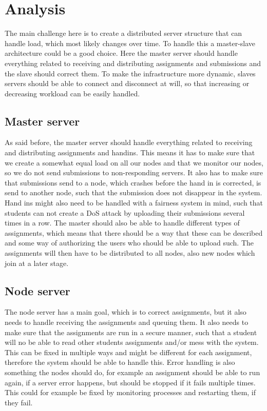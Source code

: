 \chapter{Analysis}
The main challenge here is to create a distributed server structure that can
handle load, which most likely changes over time. To handle this a master-slave
architecture could be a good choice. Here the master server should handle
everything related to receiving and distributing assignments and submissions and
the slave should correct them. To make the infrastructure more dynamic, slaves
servers should be able to connect and disconnect at will, so that increasing or
decreasing workload can be easily handled.

\section{Master server}
As said before, the master server should handle everything related to receiving
and distributing assignments and handins. This means it has to make sure that we
create a somewhat equal load on all our nodes and that we monitor our nodes, so
we do not send submissions to non-responding servers. It also has to make sure
that submissions send to a node, which crashes before the hand in is corrected,
is send to another node, such that the submission does not disappear in the
system.
Hand ins might also need to be handled with a fairness system in mind, such that
students can not create a DoS attack by uploading their submissions several
times in a row.
The master should also be able to handle different types of assignments, which
means that there should be a way that these can be described and some way of
authorizing the users who should be able to upload such.
The assignments will then have to be distributed to all nodes, also new nodes
which join at a later stage.

\section{Node server}
The node server has a main goal, which is to correct assignments, but it also
needs to handle receiving the assignments and queuing them. It also needs to
make sure that the assignments are run in a secure manner, such that a student
will no be able to read other students assignments and/or mess with the system.
This can be fixed in multiple ways and might be different for each assignment,
therefore the system should be able to handle this.
Error handling is also something the nodes should do, for example an assignment
should be able to run again, if a server error happens, but should be stopped if
it fails multiple times. This could for example be fixed by monitoring processes
and restarting them, if they fail.

